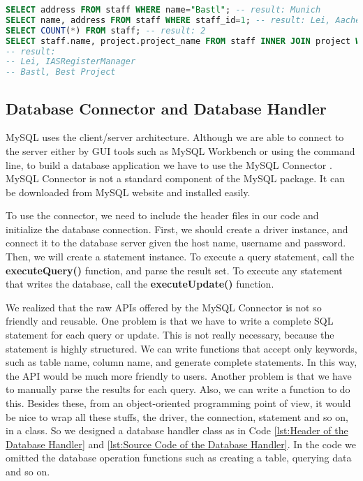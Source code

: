 \begin{lstlisting}[language=SQL, caption={Data Query\label{lst:Data Query}}]
SELECT address FROM staff WHERE name="Bastl"; -- result: Munich
SELECT name, address FROM staff WHERE staff_id=1; -- result: Lei, Aachen
SELECT COUNT(*) FROM staff; -- result: 2 
SELECT staff.name, project.project_name FROM staff INNER JOIN project WHERE staff.staff_id = project.responsible_person_id;
-- result: 
-- Lei, IASRegisterManager
-- Bastl, Best Project
\end{lstlisting}

\subsection{Database Connector and Database Handler}
MySQL uses the client/server architecture. Although we are able to connect to the server either by GUI tools such as MySQL Workbench or using the command line, to build a database application we have to use the MySQL Connector \cite{mysqlconn}. MySQL Connector is not a standard component of the MySQL package. It can be downloaded from MySQL website and installed easily.

To use the connector, we need to include the header files in our code and initialize the database connection. First, we should create a driver instance, and connect it to the database server given the host name, username and password. Then, we will create a statement instance. To execute a query statement, call the \textbf{executeQuery()} function, and parse the result set. To execute any statement that writes the database, call the \textbf{executeUpdate()} function.

We realized that the raw APIs offered by the MySQL Connector is not so friendly and reusable. One problem is that we have to write a complete SQL statement for each query or update. This is not really necessary, because the statement is highly structured. We can write functions that accept only keywords, such as table name, column name, and generate complete statements. In this way, the API would be much more friendly to users. Another problem is that we have to manually parse the results for each query. Also, we can write a function to do this. Besides these, from an object-oriented programming point of view, it would be nice to wrap all these stuffs, the driver, the connection, statement and so on, in a class. So we designed a database handler class as in Code \ref{lst:Header of the Database Handler} and \ref{lst:Source Code of the Database Handler}. In the code we omitted the database operation functions such as creating a table, querying data and so on.

